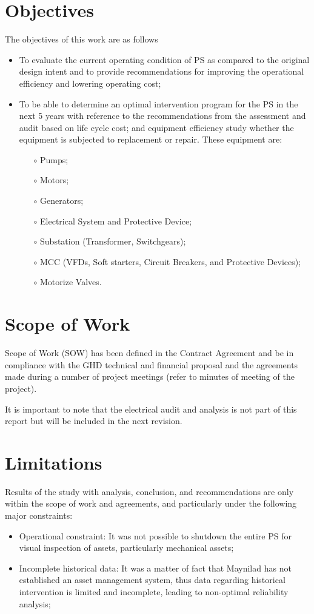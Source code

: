 \section{Objectives}
The objectives of this work are as follows
\begin{itemize}
	\item To evaluate the current operating condition of PS as compared to the original design intent and to provide recommendations for improving the operational efficiency and lowering operating cost;
	\item To be able to determine an optimal intervention program for the PS in the next 5 years with reference to the recommendations from the assessment and audit based on life cycle cost; and equipment efficiency study whether the equipment is subjected to replacement or repair. These equipment are:
	\begin{itemize}
		\item[$\circ$] Pumps;
		\item[$\circ$] Motors;
		\item[$\circ$] Generators;
		\item[$\circ$] Electrical System and Protective Device;
		\item[$\circ$] Substation (Transformer, Switchgears);
		\item[$\circ$] MCC (VFDs, Soft starters, Circuit Breakers, and Protective Devices);
		\item[$\circ$] Motorize Valves.	
	\end{itemize}
\end{itemize}

\section{Scope of Work}
Scope of Work (SOW) has been defined in the Contract Agreement and be in compliance with the GHD technical and financial proposal and the agreements made during a number of project meetings (refer to minutes of meeting of the project). 

{\color{red}
It is important to note that the electrical audit and analysis is not part of this report but will be included in the next revision.
}


\section{Limitations}
Results of the study with analysis, conclusion, and recommendations are only within the scope of work and agreements, and particularly under the following major constraints:
\begin{itemize}
\item Operational constraint: It was not possible to shutdown the entire PS for visual inspection of assets, particularly mechanical assets;
\item Incomplete historical data: It was a matter of fact that Maynilad has not established an asset management system, thus data regarding historical intervention is limited and incomplete, leading to non-optimal reliability analysis; 
\end{itemize}




